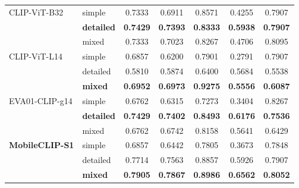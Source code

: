 \documentclass[11pt]{article}
\renewcommand{\_}{\textunderscore\allowbreak{}}
\begin{document}
\begin{longtable}{@{}llccccc@{}}
CLIP-ViT-B32            & simple            & 0.7333          & 0.6911          & 0.8571          & 0.4255          & 0.7907          \\
\textbf{}               & \textbf{detailed} & \textbf{0.7429} & \textbf{0.7393} & \textbf{0.8333} & \textbf{0.5938} & \textbf{0.7907} \\
                        & mixed             & 0.7333          & 0.7023          & 0.8267          & 0.4706          & 0.8095          \\
\addlinespace
CLIP-ViT-L14            & simple            & 0.6857          & 0.6200          & 0.7901          & 0.2791          & 0.7907          \\
                        & detailed          & 0.5810          & 0.5874          & 0.6400          & 0.5684          & 0.5538          \\
\textbf{}               & \textbf{mixed}    & \textbf{0.6952} & \textbf{0.6973} & \textbf{0.9275} & \textbf{0.5556} & \textbf{0.6087} \\
\addlinespace
EVA01-CLIP-g14          & simple            & 0.6762          & 0.6315          & 0.7273          & 0.3404          & 0.8267          \\
\textbf{}               & \textbf{detailed} & \textbf{0.7429} & \textbf{0.7402} & \textbf{0.8493} & \textbf{0.6176} & \textbf{0.7536} \\
                        & mixed             & 0.6762          & 0.6742          & 0.8158          & 0.5641          & 0.6429          \\
\addlinespace
\textbf{MobileCLIP-S1}  & simple            & 0.6857          & 0.6442          & 0.7805          & 0.3673          & 0.7848          \\
                        & detailed          & 0.7714          & 0.7563          & 0.8857          & 0.5926          & 0.7907          \\
\textbf{}               & \textbf{mixed}    & \textbf{0.7905} & \textbf{0.7867} & \textbf{0.8986} & \textbf{0.6562} & \textbf{0.8052} \\

\end{longtable}
\endgroup
\end{document}

